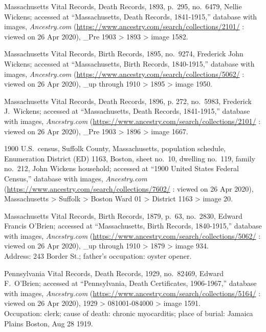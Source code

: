 \begin{thebibliography}{999}
	Massachusetts Vital Records, Death Records, 1893, p.\ 295, no.\ 6479, Nellie Wickens; accessed at ``Massachusetts, Death Records, 1841-1915,'' database with images, \textit{Ancestry.com} (\url{https://www.ancestry.com/search/collections/2101/} : viewed on 26 Apr 2020), \_Pre 1903 > 1893 > image 1582.
	
	Massachusetts Vital Records, Birth Records, 1895, no.\ 9274, Frederick John Wickens; accessed at ``Massachusetts, Birth Records, 1840-1915,'' database with images, \textit{Ancestry.com} (\url{https://www.ancestry.com/search/collections/5062/} : viewed on 26 Apr 2020), \_up through 1910 > 1895 > image 1950.
	
	Massachusetts Vital Records, Death Records, 1896, p. 272, no.\ 5983, Frederick J.\ Wickens; accessed at ``Massachusetts, Death Records, 1841-1915,'' database with images, \textit{Ancestry.com} (\url{https://www.ancestry.com/search/collections/2101/} : viewed on 26 Apr 2020), \_Pre 1903 > 1896 > image 1667.
	
	1900 U.S.\ census, Suffolk County, Massachusetts, population schedule, Enumeration District (ED) 1163,  Boston, sheet no.\ 10, dwelling no.\ 119, family no.\ 212, John Wickens household; accessed at ``1900 United States Federal Census,'' database with images, \textit{Ancestry.com} (\url{https://www.ancestry.com/search/collections/7602/} : viewed on 26 Apr 2020), Massachusetts > Suffolk > Boston Ward 01 > District 1163 > image 20.
	
	Massachusetts Vital Records, Birth Records, 1879, p.\ 63, no.\ 2830, Edward Francis O'Brien; accessed at ``Massachusetts, Birth Records, 1840-1915,'' database with images, \textit{Ancestry.com} (\url{https://www.ancestry.com/search/collections/5062/} : viewed on 26 Apr 2020), \_up through 1910 > 1879 > image 934.\\
	Address: 243 Border St.; father's occupation: oyster opener.
	
	Pennsylvania Vital Records, Death Records, 1929, no.\ 82469, Edward F.\ O'Brien; accessed at ``Pennsylvania, Death Certificates, 1906-1967,'' database with images, \textit{Ancestry.com} (\url{https://www.ancestry.com/search/collections/5164/} : viewed on 26 Apr 2020), 1929 > 081001-084000 > image 1591.\\
	Occupation: clerk; cause of death: chronic myocarditis; place of burial: Jamaica Plains Boston, Aug 28 1919.
	

\end{thebibliography}
